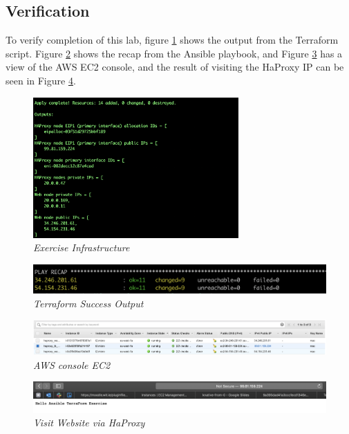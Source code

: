 \subsection{Verification}
To verify completion of this lab, figure \ref{img:v1} shows the output from the Terraform script. Figure \ref{img:v2} shows the recap from the Ansible playbook, and Figure \ref{img:v3} has a view of the AWS EC2 console, and the result of visiting the HaProxy IP can be seen in Figure \ref{img:v4}.
\begin{figure}[!ht]
\centering
\includegraphics*[width=0.7\textwidth]{images/ver1.png}
\caption{\em Exercise Infrastructure}
\label{img:v1}
\end{figure}

\begin{figure}[!ht]
\centering
\includegraphics*[width=1\textwidth]{images/ver2.png}
\caption{\em Terraform Success Output}
\label{img:v2}
\end{figure}

\begin{figure}[!ht]
\centering
\includegraphics*[width=1\textwidth]{images/ver4.png}
\caption{\em AWS console EC2}
\label{img:v3}
\end{figure}

\begin{figure}[!ht]
\centering
\includegraphics*[width=1\textwidth]{images/ver3.png}
\caption{\em Visit Website via HaProxy}
\label{img:v4}
\end{figure}








